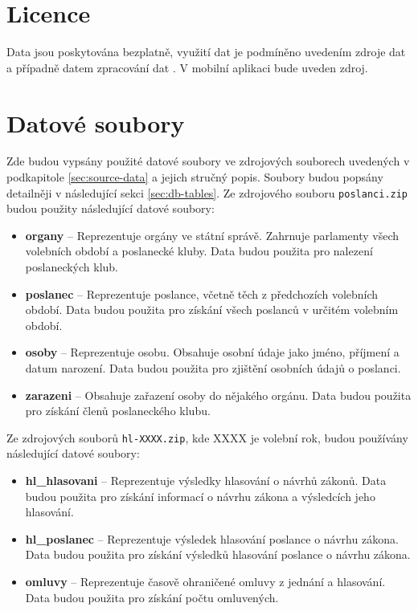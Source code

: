 \section{Licence}

Data jsou poskytována bezplatně, využití dat je podmíněno uvedením zdroje dat a případně datem zpracování dat \cite{psp-data}. V mobilní aplikaci bude uveden zdroj.

\section{Datové soubory}
\label{sec:data-file}

Zde budou vypsány použité datové soubory ve zdrojových souborech uvedených v podkapitole \ref{sec:source-data} a jejich stručný popis. Soubory budou popsány detailněji v následující sekci \ref{sec:db-tables}. Ze zdrojového souboru \lstinline|poslanci.zip| budou použity následující datové soubory:

\begin{itemize}
	\item \textbf{organy} -- Reprezentuje orgány ve státní správě. Zahrnuje parlamenty všech volebních období a poslanecké kluby. Data budou použita pro nalezení poslaneckých klub.
	
	\item \textbf{poslanec} -- Reprezentuje poslance, včetně těch z předchozích volebních období. Data budou použita pro získání všech poslanců v určitém volebním období.
	
	\item \textbf{osoby} -- Reprezentuje osobu. Obsahuje osobní údaje jako jméno, příjmení a datum narození. Data budou použita pro zjištění osobních údajů o poslanci.
	
	\item \textbf{zarazeni} -- Obsahuje zařazení osoby do nějakého orgánu. Data budou použita pro získání členů poslaneckého klubu.
\end{itemize}

\noindent Ze zdrojových souborů \lstinline|hl-XXXX.zip|, kde XXXX je volební rok, budou používány následující datové soubory:

\begin{itemize}
	\item \textbf{hl\_hlasovani} -- Reprezentuje výsledky hlasování o návrhů zákonů. Data budou použita pro získání informací o návrhu zákona a výsledcích jeho hlasování.
	
	\item \textbf{hl\_poslanec} -- Reprezentuje výsledek hlasování poslance o návrhu zákona. Data budou použita pro získání výsledků hlasování poslance o návrhu zákona.
	
	\item \textbf{omluvy} -- Reprezentuje časově ohraničené omluvy z jednání a hlasování. Data budou použita pro získání počtu omluvených. 
\end{itemize}

